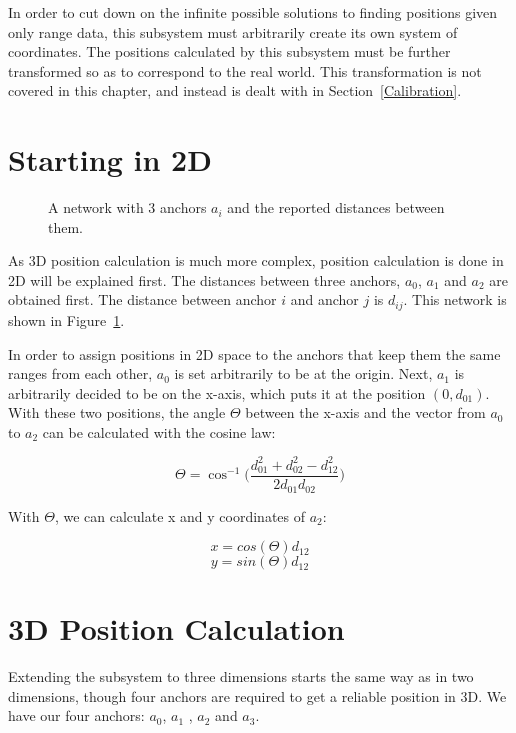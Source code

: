 In order to cut down on the infinite possible solutions to finding positions given only range data, this subsystem must arbitrarily create its own system of coordinates. The positions calculated by this subsystem must be further transformed so as to correspond to the real world. This transformation is not covered in this chapter, and instead is dealt with in Section~\ref{Calibration}.

\section{Starting in 2D}
\label{HighLevelExample}

\begin{figure}
	\centering
	
	\decoRule
	\caption{A network with 3 anchors $a_i$ and the reported distances between them.}
	\label{fig:PositionCalculationNetwork}
\end{figure}

As 3D position calculation is much more complex, position calculation is done in 2D will be explained first. The distances between three anchors, $a_{0}$, $ a_{1}$  and $a_{2}$ are obtained first. The distance between anchor $i$ and anchor $j$ is $d_{ij}$. This network is shown in Figure~\ref{fig:PositionCalculationNetwork}.

In order to assign positions in 2D space to the anchors that keep them the same ranges from each other, $a_{0}$ is set arbitrarily to be at the origin. Next, $a_{1}$ is arbitrarily decided to be on the x-axis, which puts it at the position $(0, d_{01})$. With these two positions, the angle $\Theta$ between the x-axis and the vector from $a_0$ to $a_2$ can be calculated with the cosine law:

\[ \Theta = \cos ^{-1}\Big(\frac{d_{01}^2 + d_{02}^2 - d_{12}^2 }{2 d_{01} d_{02}}\Big)\]

With $\Theta$, we can calculate x and y coordinates of $a_2$:

\[ x = cos(\Theta) d_{12} \]
\[ y = sin(\Theta) d_{12} \]

\section{3D Position Calculation}
Extending the subsystem to three dimensions starts the same way as in two dimensions, though four anchors are required to get a reliable position in 3D. We have our four anchors: $a_{0}$, $a_{1}$ , $a_{2}$ and $a_{3}$. 

